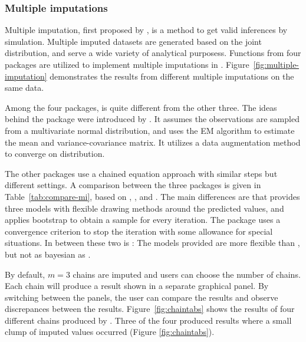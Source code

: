\documentclass[article]{jss}
\begin{document}
\subsubsection{Multiple imputations}

Multiple imputation, first proposed by \citet{rubin1978multiple}, is a method to get valid inferences by simulation. Multiple imputed datasets are generated based on the joint distribution, and serve a wide variety of analytical purposess. Functions from four  packages are utilized to implement multiple imputations in . Figure~\ref{fig:multiple-imputation} demonstrates the results from different multiple imputations on the same data. 

Among the four packages,  is quite different from the other three. The ideas behind the package were introduced by \citet{schafer1998multiple}. It assumes the observations are sampled from a multivariate normal distribution, and uses the EM algorithm to estimate the mean and variance-covariance matrix. It utilizes a data augmentation method to converge on distribution. 

The other packages use a chained equation approach with similar steps but different settings. A comparison between the three packages is given in Table~\ref{tab:compare-mi}, based on \citet{hmisc}, \citet{mice}, and \citet{mi}. The main differences are that  provides three models with flexible drawing methods around the predicted values, and applies bootstrap to obtain a sample for every iteration. The package  uses a convergence criterion to stop the iteration with some allowance for special situations. In between these two is : The models provided are more flexible than , but not as bayesian as .

By default, $m=3$ chains are imputed and users can choose the number of chains. Each chain will produce a result shown in a separate graphical panel. By switching between the panels, the user can compare the results and observe discrepances between the results. Figure~\ref{fig:chaintabs} shows the results of four different chains produced by . Three of the four produced results where a small clump of imputed values occurred (Figure \ref{fig:chaintabs}).
\end{document}
